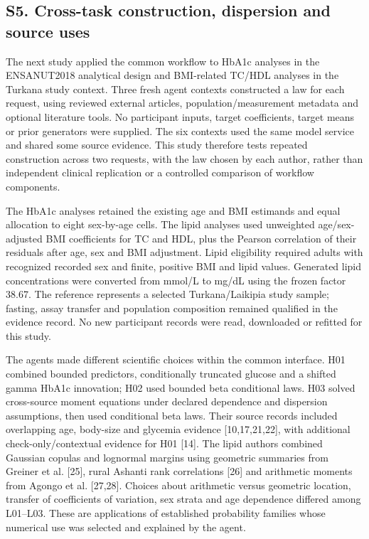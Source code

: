\documentclass[sigconf,review]{acmart}
\begin{document}
\subsection*{S5. Cross-task construction, dispersion and source uses}

The next study applied the common workflow to HbA1c analyses in the ENSANUT2018 analytical design and BMI-related TC/\allowbreak{}HDL analyses in the Turkana study context. Three fresh agent contexts constructed a law for each request, using reviewed external articles, population/\allowbreak{}measurement metadata and optional literature tools. No participant inputs, target coefficients, target means or prior generators were supplied. The six contexts used the same model service and shared some source evidence. This study therefore tests repeated construction across two requests, with the law chosen by each author, rather than independent clinical replication or a controlled comparison of workflow components.


The HbA1c analyses retained the existing age and BMI estimands and equal allocation to eight sex-by-age cells. The lipid analyses used unweighted age/\allowbreak{}sex-adjusted BMI coefficients for TC and HDL, plus the Pearson correlation of their residuals after age, sex and BMI adjustment. Lipid eligibility required adults with recognized recorded sex and finite, positive BMI and lipid values. Generated lipid concentrations were converted from mmol/\allowbreak{}L to mg/\allowbreak{}dL using the frozen factor 38.67. The reference represents a selected Turkana/\allowbreak{}Laikipia study sample; fasting, assay transfer and population composition remained qualified in the evidence record. No new participant records were read, downloaded or refitted for this study.


The agents made different scientific choices within the common interface. H01 combined bounded predictors, conditionally truncated glucose and a shifted gamma HbA1c innovation; H02 used bounded beta conditional laws. H03 solved cross-source moment equations under declared dependence and dispersion assumptions, then used conditional beta laws. Their source records included overlapping age, body-size and glycemia evidence [10,17,21,22], with additional check-only/\allowbreak{}contextual evidence for H01 [14]. The lipid authors combined Gaussian copulas and lognormal margins using geometric summaries from Greiner et al. [25], rural Ashanti rank correlations [26] and arithmetic moments from Agongo et al. [27,28]. Choices about arithmetic versus geometric location, transfer of coefficients of variation, sex strata and age dependence differed among L01–\allowbreak{}L03. These are applications of established probability families whose numerical use was selected and explained by the agent.
\end{document}
